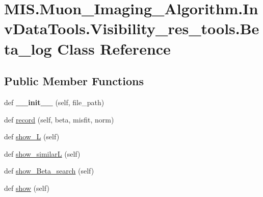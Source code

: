 \hypertarget{classMIS_1_1Muon__Imaging__Algorithm_1_1InvDataTools_1_1Visibility__res__tools_1_1Beta__log}{}\section{M\+I\+S.\+Muon\+\_\+\+Imaging\+\_\+\+Algorithm.\+Inv\+Data\+Tools.\+Visibility\+\_\+res\+\_\+tools.\+Beta\+\_\+log Class Reference}
\label{classMIS_1_1Muon__Imaging__Algorithm_1_1InvDataTools_1_1Visibility__res__tools_1_1Beta__log}
\subsection*{Public Member Functions}
\begin{DoxyCompactItemize}
\item 
\mbox{\label{classMIS_1_1Muon__Imaging__Algorithm_1_1InvDataTools_1_1Visibility__res__tools_1_1Beta__log_a96bd1ecb01c700530dc90de8831a568d}} 
def {\bfseries \+\_\+\+\_\+init\+\_\+\+\_\+} (self, file\+\_\+path)
\item 
def \hyperlink{classMIS_1_1Muon__Imaging__Algorithm_1_1InvDataTools_1_1Visibility__res__tools_1_1Beta__log_a18337dc353bd7e45569520b446992c21}{record} (self, beta, misfit, norm)
\item 
def \hyperlink{classMIS_1_1Muon__Imaging__Algorithm_1_1InvDataTools_1_1Visibility__res__tools_1_1Beta__log_ae8d097b9dd31417fba079d414a7d9040}{show\+\_\+L} (self)
\item 
def \hyperlink{classMIS_1_1Muon__Imaging__Algorithm_1_1InvDataTools_1_1Visibility__res__tools_1_1Beta__log_a18993b9a53fbd1ec12991bbafb7dea73}{show\+\_\+similarL} (self)
\item 
def \hyperlink{classMIS_1_1Muon__Imaging__Algorithm_1_1InvDataTools_1_1Visibility__res__tools_1_1Beta__log_ade30dc75139b68cdb1a0e045090378fa}{show\+\_\+\+Beta\+\_\+search} (self)
\item 
def \hyperlink{classMIS_1_1Muon__Imaging__Algorithm_1_1InvDataTools_1_1Visibility__res__tools_1_1Beta__log_a855a00c519ff2d08b68028975f278d7f}{show} (self)
\end{DoxyCompactItemize}
